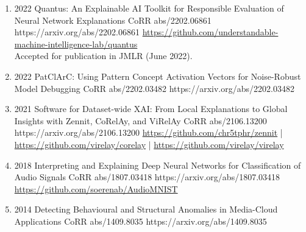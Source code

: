 \documentclass[10pt,a4paper]{article} %
\begin{document}
{\begin{enumerate}
        \item {}
                            {2022}
                            {Quantus: An Explainable AI Toolkit for Responsible Evaluation of Neural Network Explanations}
                            {CoRR abs/2202.06861}
                            {https://arxiv.org/abs/2202.06861}
                            {\href{https://github.com/understandable-machine-intelligence-lab/quantus}{https://github.com/understandable-machine-intelligence-lab/quantus}\\
                            Accepted for publication in JMLR (June 2022).
                            }

        \item {}
                            {2022}
                            {PatClArC: Using Pattern Concept Activation Vectors for Noise-Robust Model Debugging}
                            {CoRR abs/2202.03482}
                            {https://arxiv.org/abs/2202.03482}

        \item {}
                            {2021}
                            {Software for Dataset-wide XAI: From Local Explanations to Global Insights with Zennit, CoRelAy, and ViRelAy}
                            {CoRR abs/2106.13200}
                            {https://arxiv.org/abs/2106.13200}
                            {   \href{https://github.com/chr5tphr/zennit}{https://github.com/chr5tphr/zennit} | \\
                                \href{https://github.com/virelay/corelay}{https://github.com/virelay/corelay} |
                                \href{https://github.com/virelay/virelay}{https://github.com/virelay/virelay}
                            }

        \item {}
                            {2018}
                            {Interpreting and Explaining Deep Neural Networks for Classification of Audio Signals}
                            {CoRR abs/1807.03418}
                            {https://arxiv.org/abs/1807.03418}
                            {\href{https://github.com/soerenab/AudioMNIST}{https://github.com/soerenab/AudioMNIST}}

        \item {}
                            {2014}
                            {Detecting Behavioural and Structural Anomalies in Media-Cloud Applications}
                            {CoRR abs/1409.8035}
                            {https://arxiv.org/abs/1409.8035}

    \end{enumerate}

}
\end{document}
